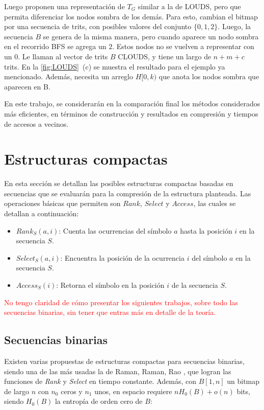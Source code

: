 

Luego proponen una representación de $T_{G}$ similar a la de LOUDS, pero que permita diferenciar los nodos sombra de los demás. Para esto, cambian el bitmap por una secuencia de trits, con posibles valores del conjunto $\{0, 1, 2\}$. Luego, la secuencia $B$ se genera de la misma manera, pero cuando aparece un nodo sombra en el recorrido BFS se agrega un $2$. Estos nodos no se vuelven a representar con un $0$. Le llaman al vector de trits $B$ CLOUDS, y tiene un largo de $n + m + c$ trits. En la \autoref{fig:LOUDS}~(c) se muestra el resultado para el ejemplo ya mencionado. Además, necesita un arreglo $H[0, k)$ que anota los nodos sombra que aparecen en B.


En este trabajo, se considerarán en la comparación final los métodos considerados más eficientes, en términos de construcción y resultados en compresión y tiempos de accesos a vecinos.



\section{Estructuras compactas} \label{sec:compactEstruct}
En esta sección se detallan las posibles estructuras compactas basadas en secuencias que se evaluarán para la compresión de la estructura planteada. Las operaciones básicas que permiten son \textbf{$Rank$}, \textbf{$Select$} y \textbf{$Access$}, las cuales se detallan a continuación:

\begin{itemize}
	\item \textbf{$Rank_{S}(a, i)$}: Cuenta las ocurrencias del símbolo $a$ hasta la posición $i$ en la secuencia $S$.
	\item \textbf{$Select_{S}(a, i)$}: Encuentra la posición de la ocurrencia $i$ del símbolo $a$ en la secuencia $S$.
	\item \textbf{$Access_{S}(i)$}: Retorna el símbolo en la posición $i$ de la secuencia $S$.
\end{itemize}

\textcolor{red}{No tengo claridad de cómo presentar los siguientes trabajos, sobre todo las secuencias binarias, sin tener que entras más en detalle de la teoría.}

\subsection{Secuencias binarias}
Existen varias propuestas de estructuras compactas para secuencias binarias, siendo una de las más usadas la de Raman, Raman, Rao \cite{raman2002succinct}, que logran las funciones de \textit{Rank} y \textit{Select} en tiempo constante. Además, con $B[1, n]$ un bitmap de largo $n$ con $n_{0}$ ceros y $n_{1}$ unos, en espacio requiere $nH_{0}(B) + o(n)$ bits, siendo $H_{0}(B)$ la entropía de orden cero de $B$: 


